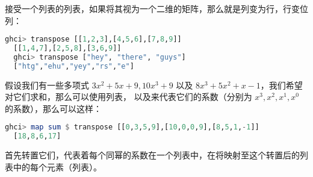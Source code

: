 \documentclass[./main.tex]{subfiles}
\begin{document}
接受一个列表的列表，如果将其视为一个二维的矩阵，那么就是列变为行，行变位列：

\begin{lstlisting}[language=Haskell]
  ghci> transpose [[1,2,3],[4,5,6],[7,8,9]]
  [[1,4,7],[2,5,8],[3,6,9]]
  ghci> transpose ["hey", "there", "guys"]
  ["htg","ehu","yey","rs","e"]
\end{lstlisting}

假设我们有一些多项式 $3x^2 + 5x + 9, 10x^3 + 9$ 以及 $ 8x^3 + 5x^2 + x - 1$，我们希望对它们求和，那么可以使用列表\acode{[0,3,5,9]}，
\acode{[10,0,0,9]}以及\acode{[8,5,1,-1]}来代表它们的系数（分别为 $x^3,x^2,x^1,x^0$ 的系数），那么可以这样：

\begin{lstlisting}[language=Haskell]
  ghci> map sum $ transpose [[0,3,5,9],[10,0,0,9],[8,5,1,-1]]
  [18,8,6,17]
\end{lstlisting}

首先转置它们，代表着每个同幂的系数在一个列表中，在将映射至这个转置后的列表中的每个元素（列表）。

\end{document}
